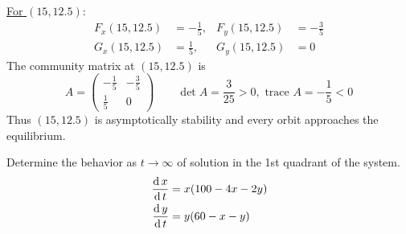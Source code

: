 \documentclass[../main-sheet.tex]{subfiles}
\begin{document}
\begin{soln}
    \underline{For \((15,12.5)\)}:\begin{align*}
        F_x(15,12.5)&=-\frac{1}{5}, &F_y(15,12.5)&=-\frac{3}{5}\\
        G_x(15,12.5)&=\frac{1}{5}, &G_y(15,12.5)&=0
    \end{align*}
    The community matrix at \((15,12.5)\) is 
    \[A=\begin{pmatrix}
        -\frac{1}{5}&-\frac{3}{5}\\
        \frac{1}{5}&0
    \end{pmatrix}\qquad \det A=\frac{3}{25}>0,\text{ trace }A=-\frac{1}{5}<0\]
    Thus \((15,12.5)\) is asymptotically stability and every orbit approaches the equilibrium.
\end{soln}
\begin{prob}
    Determine the behavior as \(t\to \infty\) of solution in the 1st quadrant of the system.
    \begin{align*}
        \,\frac{\mathrm{d}\,x}{\mathrm{d}\,t}&=x(100-4x-2y)\\
        \,\frac{\mathrm{d}\,y}{\mathrm{d}\,t}&=y(60-x-y)\\
    \end{align*}
\end{prob}
\end{document}
